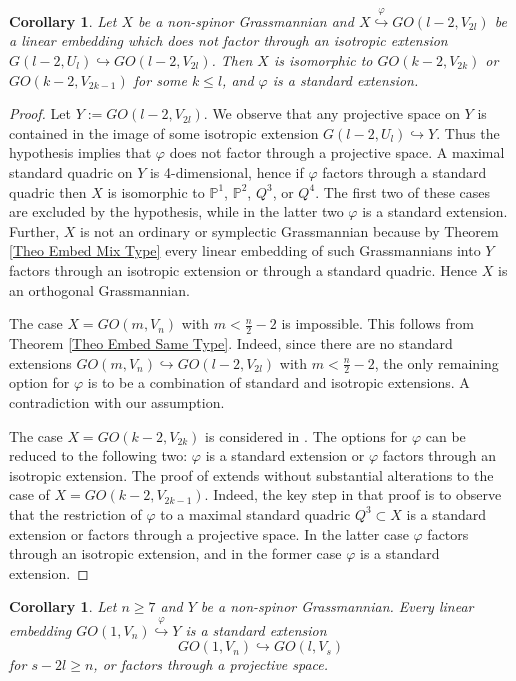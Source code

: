 \documentclass[12pt]{amsart}
\def\PP {{\mathbb P}}     %
\def\hw  {\hookrightarrow}
\newtheorem{coro}[theorem]{Corollary}
\begin{document}
\begin{coro}\label{Coro Embed in GOcodim2even}
Let $X$ be a non-spinor Grassmannian and $X\stackrel{\varphi}{\hw} GO(l-2,V_{2l})$ be a linear embedding which does not factor through an isotropic extension $G(l-2,U_l)\hw GO(l-2,V_{2l})$. Then $X$ is isomorphic to $GO(k-2,V_{2k})$ or $GO(k-2,V_{2k-1})$ for some $k\leq l$, and $\varphi$ is a standard extension.
\end{coro}

\begin{proof}
Let $Y:=GO(l-2,V_{2l})$. We observe that any projective space on $Y$ is contained in the image of some isotropic extension $G(l-2,U_l)\hw Y$. Thus the hypothesis implies that $\varphi$ does not factor through a projective space. A maximal standard quadric on $Y$ is 4-dimensional, hence if $\varphi$ factors through a standard quadric then $X$ is isomorphic to $\PP^1$, $\PP^2$, $Q^3$, or $Q^4$. The first two of these cases are excluded by the hypothesis, while in the latter two $\varphi$ is a standard extension. Further, $X$ is not an ordinary or symplectic Grassmannian because by Theorem \ref{Theo Embed Mix Type} every linear embedding of such Grassmannians into $Y$ factors through an isotropic extension or through a standard quadric. Hence $X$ is an orthogonal Grassmannian.

The case $X=GO(m,V_n)$ with $m< \frac{n}{2}-2$ is impossible. This follows from Theorem \ref{Theo Embed Same Type}. Indeed, since there are no standard extensions $GO(m,V_n)\hw GO(l-2,V_{2l})$ with $m< \frac{n}{2}-2$, the only remaining option for $\varphi$ is to be a combination of standard and isotropic extensions. A contradiction with our assumption.

The case $X=GO(k-2,V_{2k})$ is considered in \cite[Proposition 3.15]{Penkov-Tikhomirov-Lin-ind-Grass}. The options for $\varphi$ can be reduced to the following two: $\varphi$ is a standard extension or $\varphi$ factors through an isotropic extension. The proof of \cite[Proposition 3.15]{Penkov-Tikhomirov-Lin-ind-Grass} extends without substantial alterations to the case of $X=GO(k-2,V_{2k-1})$. Indeed, the key step in that proof is to observe that the restriction of $\varphi$ to a maximal standard quadric $Q^3\subset X$ is a standard extension or factors through a projective space. In the latter case $\varphi$ factors through an isotropic extension, and in the former case $\varphi$ is a standard extension.
\end{proof}


\begin{coro}\label{Coro Embed Quadrics}
Let $n\geq 7$ and $Y$ be a non-spinor Grassmannian. Every linear embedding $GO(1,V_n)\stackrel{\varphi}{\hookrightarrow} Y$ is a standard extension
$$
GO(1,V_n) \hookrightarrow GO(l,V_s)
$$
for $s-2l\geq n$, or factors through a projective space.
\end{coro}
\end{document}
